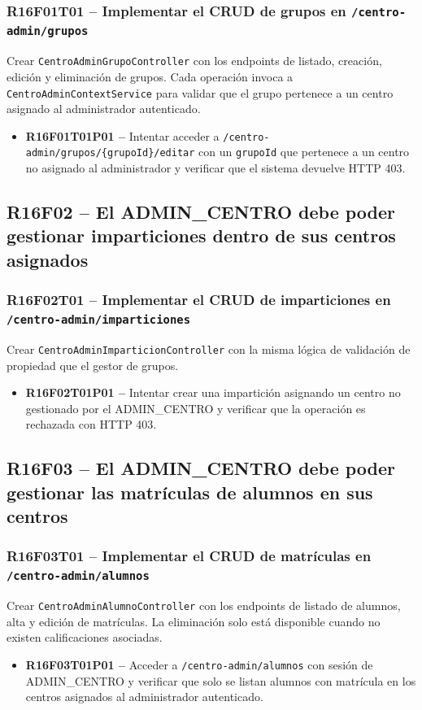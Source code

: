\documentclass[12pt, a4paper]{report}
\begin{document}
\subsubsection{R16F01T01 -- Implementar el CRUD de grupos en \texttt{/centro-admin/grupos}}
Crear \texttt{CentroAdminGrupoController} con los endpoints de listado, creación, edición y eliminación de grupos. Cada operación invoca a \texttt{CentroAdminContextService} para validar que el grupo pertenece a un centro asignado al administrador autenticado.
\begin{itemize}
  \item \textbf{R16F01T01P01 --} Intentar acceder a \texttt{/centro-admin/grupos/\{grupoId\}/editar} con un \texttt{grupoId} que pertenece a un centro no asignado al administrador y verificar que el sistema devuelve HTTP 403.
\end{itemize}

\subsection{R16F02 -- El ADMIN\_CENTRO debe poder gestionar imparticiones dentro de sus centros asignados}

\subsubsection{R16F02T01 -- Implementar el CRUD de imparticiones en \texttt{/centro-admin/imparticiones}}
Crear \texttt{CentroAdminImparticionController} con la misma lógica de validación de propiedad que el gestor de grupos.
\begin{itemize}
  \item \textbf{R16F02T01P01 --} Intentar crear una impartición asignando un centro no gestionado por el ADMIN\_CENTRO y verificar que la operación es rechazada con HTTP 403.
\end{itemize}

\subsection{R16F03 -- El ADMIN\_CENTRO debe poder gestionar las matrículas de alumnos en sus centros}

\subsubsection{R16F03T01 -- Implementar el CRUD de matrículas en \texttt{/centro-admin/alumnos}}
Crear \texttt{CentroAdminAlumnoController} con los endpoints de listado de alumnos, alta y edición de matrículas. La eliminación solo está disponible cuando no existen calificaciones asociadas.
\begin{itemize}
  \item \textbf{R16F03T01P01 --} Acceder a \texttt{/centro-admin/alumnos} con sesión de ADMIN\_CENTRO y verificar que solo se listan alumnos con matrícula en los centros asignados al administrador autenticado.
\end{itemize}
\end{document}
